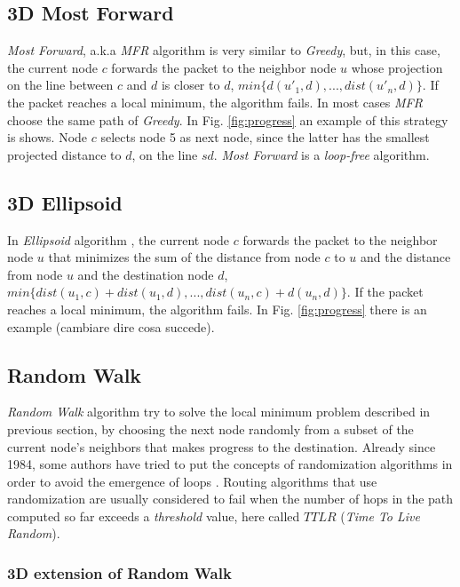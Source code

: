 \documentclass[journal,comsoc]{IEEEtran}
\begin{document}
\subsection{3D Most Forward}
\emph{Most Forward}, a.k.a \emph{MFR} algorithm \cite{tak:mfr} is very similar to \emph{Greedy}, but, in this case, the current node \(c\) forwards the packet to the neighbor node \(u\) whose projection on the line between \(c\) and \(d\) is closer to \(d\), \(min\{d(u'_1, d), ..., dist(u'_n, d)\}\). If the packet reaches a local minimum, the algorithm fails. In most cases \emph{MFR} choose the same path of \emph{Greedy}. In Fig. \ref{fig:progress} an example of this strategy is shows. Node \(c\) selects node 5 as next node, since the latter has the smallest projected distance to \(d\), on the line \(sd\). \emph{Most Forward} is a \emph{loop-free} algorithm.

\subsection{3D Ellipsoid}
In \emph{Ellipsoid} algorithm \cite{yama:compass}, the current node \(c\) forwards the packet to the neighbor node \(u\) that minimizes the sum of the distance from node \(c\) to \(u\) and the distance from node \(u\) and the destination node \(d\), \(min\{dist(u_1, c) + dist(u_1, d), ..., dist(u_n, c) + d(u_n, d)\}\). If the packet reaches a local minimum, the algorithm fails. In Fig. \ref{fig:progress} there is an example (cambiare dire cosa succede).

\subsection{Random Walk}
\emph{Random Walk} algorithm try to solve the local minimum problem described in previous section, by choosing the next node randomly from a subset of the current node's neighbors that makes progress to the destination. Already since 1984, some authors have tried to put the concepts of randomization algorithms in order to avoid the emergence of loops \cite{nelson:random, bose:compass, fevens:abface}. Routing algorithms that use randomization are usually considered to fail when the number of hops in the path computed so far exceeds a \emph{threshold} value, here called \(TTLR\) (\emph{Time To Live Random}).
\subsubsection{3D extension of Random Walk}
\end{document}
